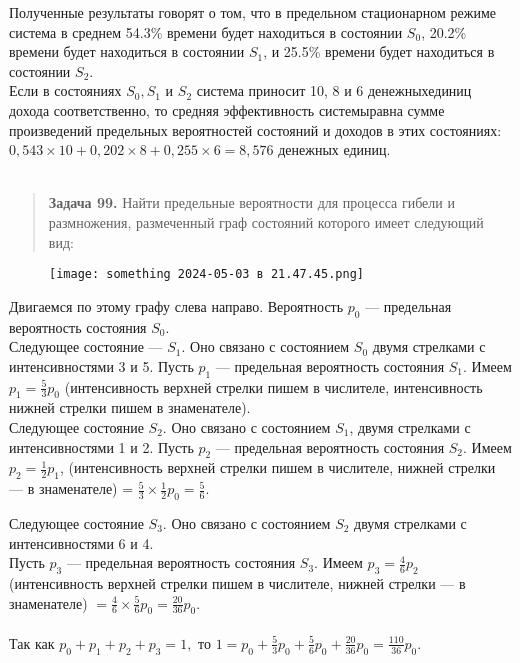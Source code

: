 \documentclass{article}
\begin{document}
Полученные результаты говорят о том, что в предельном стационарном режиме система в среднем 54.3\% времени будет находиться в состоянии $S_0$, 20.2\% времени будет находиться в состоянии $S_1$, и 25.5\% времени будет находиться в состоянии $S_2$.
\\ \indent
Если в состояниях $S_0, S_1$ и $S_2$ система приносит 10, 8 и 6 денежныхединиц дохода соответственно, то средняя эффективность системыравна сумме произведений предельных вероятностей состояний и доходов в этих состояниях: $ 0,543 \times 10 + 0,202\times8 + 0,255\times6 = 8,576$ денежных единиц.
\\ \\
\begin{quote}
\textbf{Задача  99.} Найти предельные вероятности для процесса гибели и размножения, размеченный граф состояний которого имеет следующий вид:

\end{quote}
\begin{figure}[h] 
\centering
\texttt{[image: something 2024-05-03 в 21.47.45.png]}
\label{fig:my_label}
\end{figure} 

\vspace{5em} %


 Двигаемся по этому графу слева направо.  Вероятность $p_0$ — предельная вероятность состояния $S_0$. \\ 
\indent Следующее состояние  —  $S_1$. Оно связано с состоянием $S_0$ двумя стрелками с интенсивностями  3  и 5.  Пусть $p_1$  —  предельная вероятность состояния $S_1$. Имеем $p_1 = \frac{5}{3}p_0$ (интенсивность верхней стрелки пишем в числителе, интенсивность нижней стрелки пишем в знаменателе). \\ \indent
Следующее  состояние $S_2$.  Оно  связано  с  состоянием  $S_1$,  двумя стрелками с  интенсивностями  1  и  2.  Пусть $p_2$ —  предельная вероятность состояния $S_2$.  Имеем $p_2 = \frac{1}{2}p_1$, (интенсивность верхней стрелки пишем в числителе, нижней стрелки — в знаменателе) = $\frac{5}{3}\times\frac{1}{2}p_0 = \frac{5}{6}.$ \\ \indent

Следующее  состояние  $S_3$.  Оно  связано  с  состоянием $S_2$  двумя стрелками с интенсивностями 6  и 4.\\  Пусть $p_3$  — предельная  вероятность состояния $S_3$. Имеем $p_3 = \frac{4}{6}p_2$ (интенсивность верхней стрелки пишем в числителе, нижней стрелки — в знаменателе) $= \frac{4}{6}\times\frac{5}{6}p_0 = \frac{20}{36}p_0.$ \\ 
\\ \indent Так как $p_0 + p_1 + p_2 + p_3 = 1,$
то $1 = p_0 + \frac{5}{3}p_0 + \frac{5}{6}p_0 + \frac{20}{36}p_0 = \frac{110}{36}p_0.$ \\ 
\end{document}
